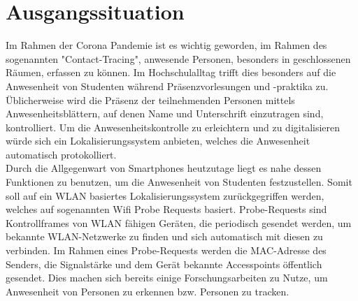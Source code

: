 \section{Ausgangssituation}
\label{introduction}

Im Rahmen der Corona Pandemie ist es wichtig geworden, im Rahmen des sogenannten "Contact-Tracing", anwesende Personen, besonders in geschlossenen Räumen, erfassen zu können.
Im Hochschulalltag trifft dies besonders auf die Anwesenheit von Studenten während Präsenzvorlesungen und -praktika zu.
Üblicherweise wird die Präsenz der teilnehmenden Personen mittels Anwesenheitsblättern, auf denen Name und Unterschrift einzutragen sind, kontrolliert.
Um die Anwesenheitskontrolle zu erleichtern und zu digitalisieren würde sich ein Lokalisierungssystem anbieten, welches die Anwesenheit automatisch protokolliert.
\\

Durch die Allgegenwart von Smartphones heutzutage liegt es nahe dessen Funktionen zu benutzen, um die Anwesenheit von Studenten festzustellen.
Somit soll auf ein WLAN basiertes Lokalisierungssystem zurückgegriffen werden, welches auf sogenannten Wifi Probe Requests basiert.
Probe-Requests sind Kontrollframes von WLAN fähigen Geräten, die periodisch gesendet werden, um bekannte WLAN-Netzwerke zu finden und sich automatisch mit diesen zu verbinden. \cite{wifiproberequests2019}
Im Rahmen eines Probe-Requests werden die MAC-Adresse des Senders, die Signalstärke und dem Gerät bekannte Accesspoints öffentlich gesendet.
Dies machen sich bereits einige Forschungsarbeiten zu Nutze, um Anwesenheit von Personen zu erkennen bzw. Personen zu tracken. \cite{sail2014,sherlock2018}
